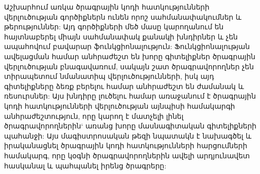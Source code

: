 {
    Աշխարհում առկա ծրագրային կոդի հատկությունների վերլուծության գործիքներն ունեն որոշ սահմանափակումներ և թերություններ:
    Այդ գործիքների մեծ մասը կարողանում են հայտնաբերել միայն սահմանափակ քանակի խնդիրներ և չեն ապահովում բավարար
    ֆունկցիոնալություն: Ֆունկցիոնալության ավելացման համար անհրաժեշտ են խորը գիտելիքներ ծրագրային վերլուծության
    բնագավառում, սակայն շատ ծրագրավորողներ չեն տիրապետում նմանատիպ վերլուծությունների, իսկ այդ գիտելիքները ձեռք բերելու
    համար անհրաժեշտ են ժամանակ և ռեսուրսներ: Այս խնդիրը լուծելու համար առաջանում է ծրագրային կոդի հատկությունների
    վերլուծության այնպիսի համակարգի անհրաժեշտություն, որը կարող է մատչելի լինել ծրագրավորողներին` առանց խորը մասնագիտական
    գիտելիքների պահանջի: Այս մագիստրոսական թեզի նպատակն է նախագծել և իրականացնել ծրագրային կոդի հատկությունների
    հարցումների համակարգ, որը կօգնի ծրագրավորողներին ավելի արդյունավետ հասկանալ և պահպանել իրենց ծրագրերը:
}
